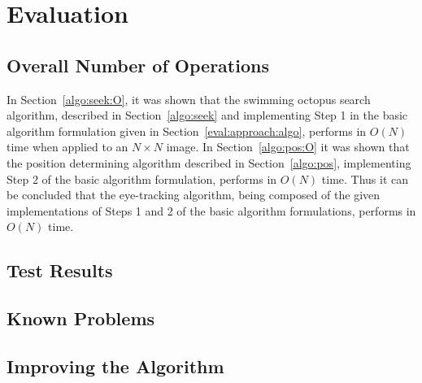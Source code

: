 
\section{Evaluation}
\label{algo:eval}

\subsection{Overall Number of Operations}
\label{algo:eval:O}

In Section~\ref{algo:seek:O}, it was shown that the swimming octopus
search algorithm, described in Section~\ref{algo:seek} and
implementing Step 1 in the basic algorithm formulation given in
Section~\ref{eval:approach:algo}, performs in $O(N)$ time when applied
to an $N\times N$ image.  In Section~\ref{algo:pos:O} it was shown
that the position determining algorithm described in
Section~\ref{algo:pos}, implementing Step 2 of the basic algorithm
formulation, performs in $O(N)$ time.  Thus it can be concluded that
the {\octopus} eye-tracking algorithm, being composed of the given
implementations of Steps 1 and 2 of the basic algorithm formulations,
performs in $O(N)$ time.

\subsection{Test Results}
\label{algo:eval:test}

\subsection{Known Problems}
\label{algo:eval:problems}

\subsection{Improving the Algorithm}
\label{algo:eval:improve}

